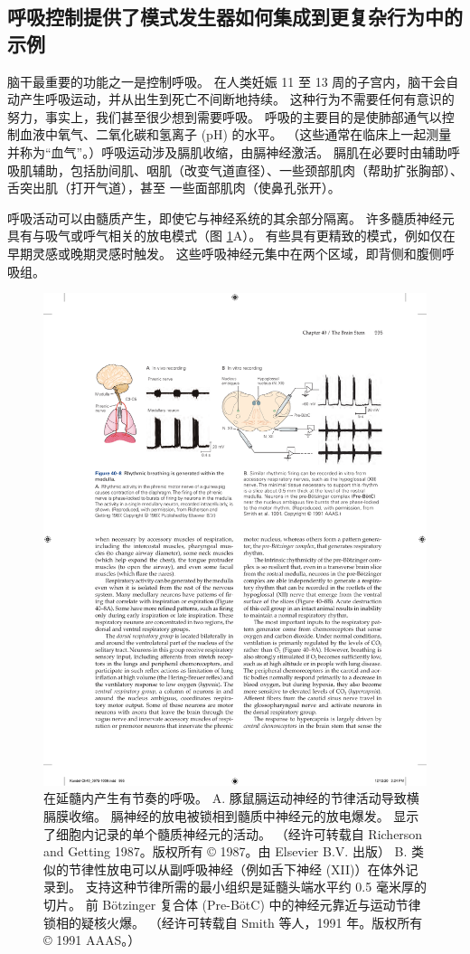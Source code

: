\subsection{呼吸控制提供了模式发生器如何集成到更复杂行为中的示例}
脑干最重要的功能之一是控制呼吸。 在人类妊娠 11 至 13 周的子宫内，脑干会自动产生呼吸运动，并从出生到死亡不间断地持续。 这种行为不需要任何有意识的努力，事实上，我们甚至很少想到需要呼吸。 呼吸的主要目的是使肺部通气以控制血液中氧气、二氧化碳和氢离子 (pH) 的水平。 （这些通常在临床上一起测量并称为“血气”。）呼吸运动涉及膈肌收缩，由膈神经激活。 膈肌在必要时由辅助呼吸肌辅助，包括肋间肌、咽肌（改变气道直径）、一些颈部肌肉（帮助扩张胸部）、舌突出肌（打开气道），甚至 一些面部肌肉（使鼻孔张开）。

呼吸活动可以由髓质产生，即使它与神经系统的其余部分隔离。 许多髓质神经元具有与吸气或呼气相关的放电模式（图 \ref{fig:40_8}A）。
有些具有更精致的模式，例如仅在早期灵感或晚期灵感时触发。 这些呼吸神经元集中在两个区域，即背侧和腹侧呼吸组。

\begin{figure}[htbp]
	\centering
	\includegraphics[width=0.95\linewidth]{chap40/fig_40_8}
	\caption{在延髓内产生有节奏的呼吸。 A. 豚鼠膈运动神经的节律活动导致横膈膜收缩。 膈神经的放电被锁相到髓质中神经元的放电爆发。 显示了细胞内记录的单个髓质神经元的活动。 （经许可转载自 Richerson and Getting 1987。版权所有 © 1987。由 Elsevier B.V. 出版） B. 类似的节律性放电可以从副呼吸神经（例如舌下神经 (XII)）在体外记录到。 支持这种节律所需的最小组织是延髓头端水平约 0.5 毫米厚的切片。 前 Bötzinger 复合体 (Pre-BötC) 中的神经元靠近与运动节律锁相的疑核火爆。 （经许可转载自 Smith 等人，1991 年。版权所有 © 1991 AAAS。）}
	\label{fig:40_8}
\end{figure}

